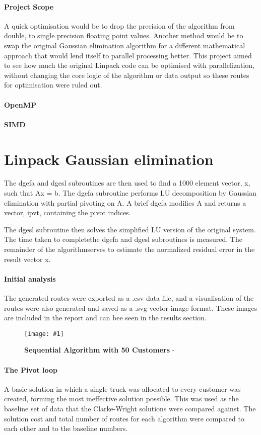 \documentclass[conference]{acmsiggraph}
\newcommand{\figuremacroW}[4]{
	\begin{figure}[h] %
		\centering
		\texttt{[image: \#1]}
		\caption[#2]{\textbf{#2} - #3}
		\label{fig:#1}
	\end{figure}
}
\begin{document}
\paragraph{Project Scope}
A quick optimisation would be to drop the precision of the algorithm from double, to single precision floating point values.
Another method would be to swap the original Gaussian elimination algorithm for a different mathematical approach that would lend itself to parallel processing better.
This project aimed to see how much the original Linpack code can be optimised with parallelization, without changing the core logic of the algorithm or data output so these routes for optimisation were ruled out.

\paragraph{OpenMP}

\paragraph{SIMD}

\section{Linpack Gaussian elimination}
The dgefa and dgesl subroutines are then used to find a 1000 element vector, x, such that Ax = b.
The dgefa subroutine performs LU decomposition by Gaussian elimination with partial pivoting on A. A brief
dgefa modifies A and returns a vector, ipvt, containing the pivot
indices. 

The dgesl subroutine then solves the simplified LU version of the original system. 
The time taken to completethe dgefa and dgesl subroutines is measured.
The remainder of the algorithmserves to estimate the normalized residual error in the result vector x. 


\paragraph{Initial analysis}
The generated routes were exported as a .csv data file, and a visualisation of the routes were also generated and saved as a .svg vector image format. These images are included in the report and can bee seen in the results section.

\figuremacroW
{linpackmat}
{Sequential Algorithm with 50 Customers}
{}
{0.75}


\paragraph{The Pivot loop}
A basic solution in which a single truck was allocated to every customer was created, forming the most ineffective solution possible. This was used as the baseline set of data that the Clarke-Wright solutions were compared against. The solution cost and total number of routes for each algorithm were compared to each other and to the baseline numbers.
\end{document}
